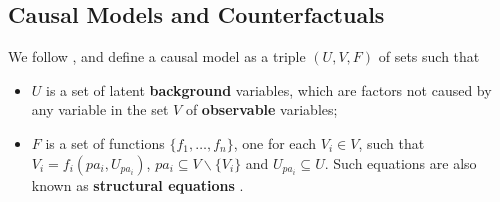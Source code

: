 



\subsection{Causal Models and Counterfactuals}
\label{subsec:cmc}
We follow %
\citet{pearl:00}, and define a causal
model as a triple $(U, V, F)$ of sets such that
%
\begin{itemize}
\item $U$ is a set of latent {\bf background} variables,%
  which are factors not caused by any variable in the set $V$ of {\bf observable} variables;
\item $F$ is a set of functions $\{f_1, \dots, f_n\}$, one for each $V_i \in V$, such
that $V_i = f_i(pa_i, U_{pa_i})$, $pa_i \subseteq V \backslash
\{V_i\}$ and $U_{pa_i} \subseteq U$. Such equations are also known as
{\bf structural equations} \citep{bol:89}.
\end{itemize}
%

